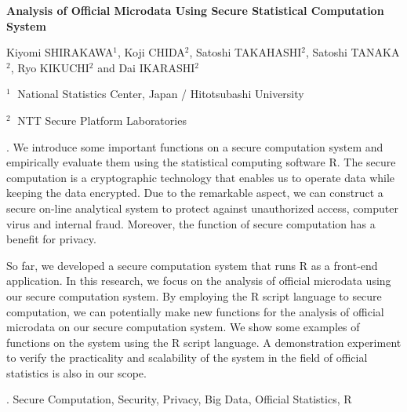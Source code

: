 \documentclass[12pt]{article}
\begin{document}
\begin{flushleft}


{\LARGE\bf Analysis of Official Microdata Using Secure Statistical Computation System
}


\vspace{1.0cm}

Kiyomi SHIRAKAWA$^1$,
Koji CHIDA$^2$,
Satoshi TAKAHASHI$^2$,
Satoshi TANAKA$^2$,
Ryo KIKUCHI$^2$ and
Dai IKARASHI$^2$

\begin{description}

\item $^1 \;$ National Statistics Center, Japan / Hitotsubashi University

\item $^2 \;$ NTT Secure Platform Laboratories

\end{description}

\end{flushleft}


\vspace{0.75cm}

.
We introduce some important functions on a secure computation system and empirically evaluate them using the statistical computing software R. The secure computation is a cryptographic technology that enables us to operate data while keeping the data encrypted. Due to the remarkable aspect, we can construct a secure on-line analytical system to protect against unauthorized access, computer virus and internal fraud. Moreover, the function of secure computation has a benefit for privacy. 

So far, we developed a secure computation system that runs R as a front-end application. In this research, we focus on the analysis of official microdata using our secure computation system. By employing the R script language to secure computation, we can potentially make new functions for the analysis of official microdata on our secure computation system. We show some examples of functions on the system using the R script language. A demonstration experiment to verify the practicality and scalability of the system in the field of official statistics is also in our scope.


\vskip 2mm

.
Secure Computation, Security, Privacy, Big Data, Official Statistics, R
\end{document}
